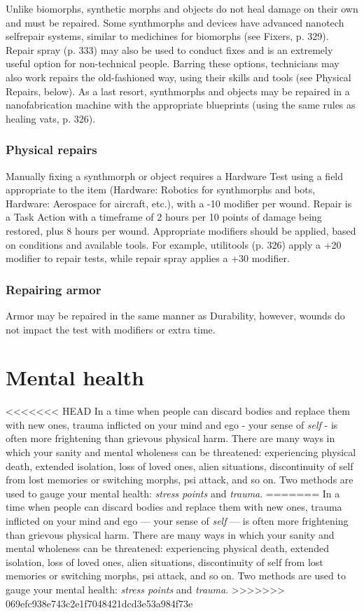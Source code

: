 Unlike biomorphs, synthetic morphs and objects do not heal damage on their own and must be repaired. Some synthmorphs and devices have advanced nanotech selfrepair systems, similar to medichines for biomorphs (see Fixers, p. 329). Repair spray (p. 333) may also be used to conduct fixes and is an extremely useful option for non-technical people. Barring these options, technicians may also work repairs the old-fashioned way, using their skills and tools (see Physical Repairs, below). As a last resort, synthmorphs and objects may be repaired in a nanofabrication machine with the appropriate blueprints (using the same rules as healing vats, p. 326).

\subsubsection{Physical repairs}

Manually fixing a synthmorph or object requires a Hardware Test using a field appropriate to the item (Hardware: Robotics for synthmorphs and bots, Hardware: Aerospace for aircraft, etc.), with a -10 modifier per wound. Repair is a Task Action with a timeframe of 2 hours per 10 points of damage being restored, plus 8 hours per wound. Appropriate modifiers should be applied, based on conditions and available tools. For example, utilitools (p. 326) apply a +20 modifier to repair tests, while repair spray applies a +30 modifier.

\subsubsection{Repairing armor}

Armor may be repaired in the same manner as Durability, however, wounds do not impact the test with modifiers or extra time.

\section{Mental health}
\label{sec:mental-health}

<<<<<<< HEAD
In a time when people can discard bodies and replace them with new ones, trauma inflicted on your mind and ego - your sense of \emph{self} - is often more frightening than grievous physical harm. There are many ways in which your sanity and mental wholeness can be threatened: experiencing physical death, extended isolation, loss of loved ones, alien situations, discontinuity of self from lost memories or switching morphs, psi attack, and so on. Two methods are used to gauge your mental health: \emph{stress points} and \emph{trauma}.
=======
In a time when people can discard bodies and replace them with new ones, trauma inflicted on your mind and ego --- your sense of \emph{self} --- is often more frightening than grievous physical harm. There are many ways in which your sanity and mental wholeness can be threatened: experiencing physical death, extended isolation, loss of loved ones, alien situations, discontinuity of self from lost memories or switching morphs, psi attack, and so on. Two methods are used to gauge your mental health: \emph{stress points} and \emph{trauma}.
>>>>>>> 069efc938e743c2e1f7048421dcd3e53a984f73e


